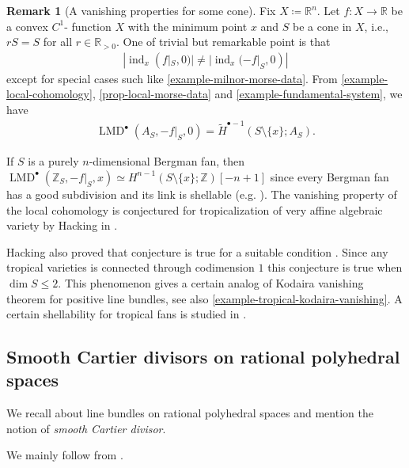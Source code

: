 \documentclass[a4paper,dvipdfmx,reqno,12pt]{amsart}
\theoremstyle{definition}
\newtheorem{remark}[theorem]{Remark}
\newcommand{\deq}{\coloneqq}
\newcommand{\opn}[1]{\operatorname{#1}}
\numberwithin{equation}{section}
\begin{document}
\begin{remark}[{A vanishing properties
for some cone}]
Fix $X\deq \mathbb{R}^{n}$.
Let $f\colon X\to {\mathbb{R}}$ be a convex $C^{1}$-
function $X$ with the minimum point $x$
and $S$ be a cone in $X$, i.e., 
$rS=S$ for all $r\in \mathbb{R}_{> 0}$.
One of trivial but remarkable point is that
\begin{align}
|\opn{ind}_x(f|_S,0)|\neq |\opn{ind}_x(-f|_S,0)|
\end{align}
except for special cases such like
\cref{example-milnor-morse-data}.
From \cref{example-local-cohomology},
\cref{prop-local-morse-data} and
\cref{example-fundamental-system}, we have
\begin{align}
\opn{LMD}^{\bullet}(A_S,-f|_S,0)=
\tilde{H}^{\bullet-1}(S\setminus \{x\};A_{S}).
\end{align}



If $S$ is a purely $n$-dimensional Bergman fan, then 
$\opn{LMD}^{\bullet}(\mathbb{Z}_S,-f|_S,x)\simeq 
H^{n-1}(S\setminus\{x\};\mathbb{Z})[-n+1]$ since every Bergman fan has a good subdivision 
\cite[Theorem 1]{MR2185977} and its link is shellable
(e.g. \cite[7.9.1. Theorem]{MR1165544}).
The vanishing property of the local cohomology is conjectured for
tropicalization of very affine algebraic variety by Hacking in
\cite{MR2452307}.

Hacking also proved that conjecture is true for a suitable condition
\cite[Theorem 2.5]{MR2452307}.
Since any tropical varieties is connected
through codimension $1$ \cite[Theorem 3.3.5]{MR3287221}
this conjecture is true when $\dim S \leq 2$.
This phenomenon gives a certain analog of Kodaira vanishing theorem for 
positive line bundles, see 
also \cref{example-tropical-kodaira-vanishing}. 
A certain shellability for tropical fans is studied in
\cite{amini2021homology}.
\end{remark}

\subsection{Smooth Cartier divisors on rational 
polyhedral spaces}



We recall about line bundles on 
rational polyhedral spaces and mention the notion of
\emph{smooth Cartier divisor}.

We mainly follow 
from \cite{MR3903579,gross2019sheaftheoretic}.

\end{document}
